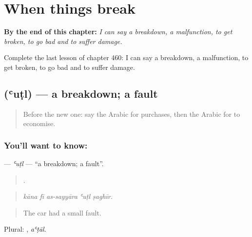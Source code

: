
\chapter{When things break}
\label{ch:ar-when-things-break}

\begin{chapteropening}
\textbf{By the end of this chapter:} \emph{I can say a breakdown, a malfunction, to get broken, to go bad and to suffer damage.}

Complete the last lesson of chapter 460: I can say a breakdown, a malfunction, to get broken, to go bad and to suffer damage.
\end{chapteropening}

\section[\texorpdfstring{\ar{عطل} (ʿuṭl)}{عطل (ʿuṭl)}]{ (ʿuṭl) — a breakdown; a fault}

\label{lesson:AR-C460-utl}



\begin{quote}
Before the new one: say the Arabic for purchases, then the Arabic for to economise.
\end{quote}

\subsection*{You'll want to know: }
\textbf{} — \emph{ʿuṭl} — \textquotedblleft{}a breakdown; a fault\textquotedblright{}.

\begin{quote}
    .
\end{quote}

\begin{quote}
\emph{kāna fī as-sayyāra ʿuṭl ṣaghīr.}
\end{quote}

\begin{quote}
The car had a small fault.
\end{quote}

Plural: , \emph{aʿṭāl}.

